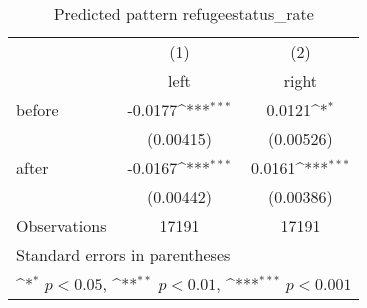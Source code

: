 \begin{table}[htbp]\centering
\def\sym#1{\ifmmode^{#1}\else\(^{#1}\)\fi}
\caption{Predicted pattern refugeestatus\_rate}
\begin{tabular}{l*{2}{c}}
\hline\hline
                    &\multicolumn{1}{c}{(1)}&\multicolumn{1}{c}{(2)}\\
                    &\multicolumn{1}{c}{left}&\multicolumn{1}{c}{right}\\
\hline
before              &     -0.0177\sym{***}&      0.0121\sym{*}  \\
                    &   (0.00415)         &   (0.00526)         \\
[1em]
after               &     -0.0167\sym{***}&      0.0161\sym{***}\\
                    &   (0.00442)         &   (0.00386)         \\
\hline
Observations        &       17191         &       17191         \\
\hline\hline
\multicolumn{3}{l}{\footnotesize Standard errors in parentheses}\\
\multicolumn{3}{l}{\footnotesize \sym{*} \(p<0.05\), \sym{**} \(p<0.01\), \sym{***} \(p<0.001\)}\\
\end{tabular}
\end{table}
